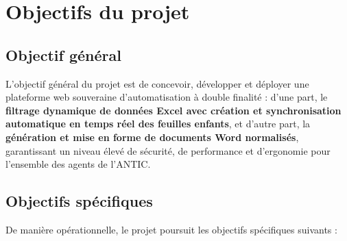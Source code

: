 \chapter{Objectifs du projet}

\section{Objectif général}

L'objectif général du projet est de concevoir, développer et déployer une plateforme web souveraine d'automatisation à double finalité : d'une part, le \textbf{filtrage dynamique de données Excel avec création et synchronisation automatique en temps réel des feuilles enfants}, et d'autre part, la \textbf{génération et mise en forme de documents Word normalisés}, garantissant un niveau élevé de sécurité, de performance et d'ergonomie pour l'ensemble des agents de l'ANTIC.

\section{Objectifs spécifiques}

De manière opérationnelle, le projet poursuit les objectifs spécifiques suivants :

